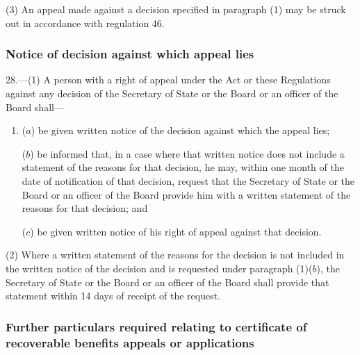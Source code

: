 \documentclass[12pt,a4paper]{article}
\begin{document}
(3) An appeal made against a decision specified in paragraph (1) may be struck out in accordance with regulation 46.

\subsubsection[28. Notice of decision against which appeal lies]{Notice of decision against which appeal lies}

28.—(1) A person with a right of appeal under the Act or these Regulations against any decision of the Secretary of State 
or the Board or an officer of the Board  %
shall—
\begin{enumerate}\item[]
($a$) be given written notice of the decision against which the appeal lies;

($b$) be informed that, in a case where that written notice does not include a statement of the reasons for that decision, he may, within one month of the date of notification of that decision, request that the Secretary of State 
or the Board or an officer of the Board  %
provide him with a written statement of the reasons for that decision; and

($c$) be given written notice of his right of appeal against that decision.
\end{enumerate}

(2) Where a written statement of the reasons for the decision is not included in the written notice of the decision and is requested under paragraph (1)($b$), the Secretary of State 
or the Board or an officer of the Board  %
shall provide that statement within 14 days of receipt of the request.


\subsubsection[29. Further particulars required relating to certificate of recoverable benefits appeals or applications]{Further particulars required relating to certificate of recoverable benefits appeals or applications}
\end{document}
